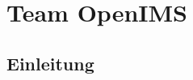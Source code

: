 \chapter{Team OpenIMS}
\label{cha:team_openims}

\section{Einleitung}
\label{sec:openims_einleitung}